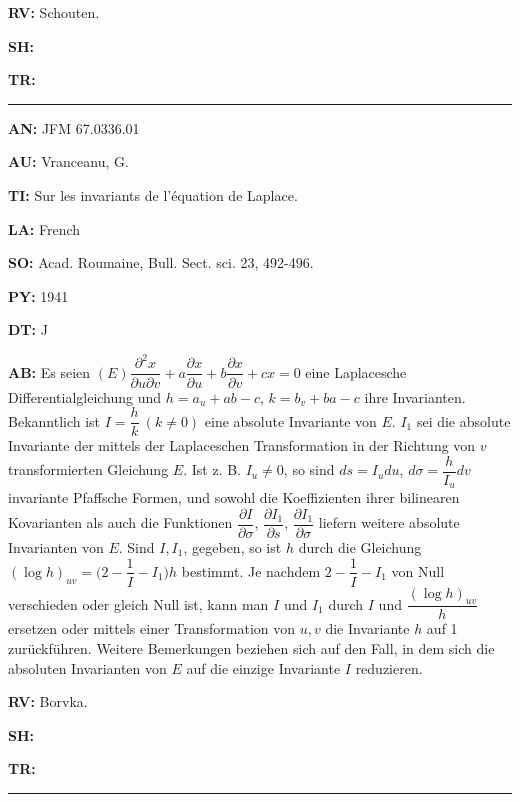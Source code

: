 \item{\bf RV:} Schouten.
\item{\bf SH:}
\item{\bf TR:}

\bigskip\par\noindent\hrule\bigskip\par

\item{\bf AN:} JFM 67.0336.01
\item{\bf AU:} Vranceanu, G.
\item{\bf TI:} Sur les invariants de l'\'equation de Laplace.
\item{\bf LA:} French
\item{\bf SO:} Acad. Roumaine, Bull. Sect. sci. 23, 492-496.
\item{\bf PY:} 1941
\item{\bf DT:} J
\item{\bf AB:}{\parindent15pt
 Es seien $(E)\dfrac{\partial ^2x}{\partial u\partial v}+
a\dfrac{\partial x}{\partial u} + b\dfrac{\partial x}{\partial v}+cx=0$
eine Laplacesche
Differentialgleichung
und $h = a_u + ab - c$, $k = b_v + ba - c$ ihre Invarianten. Bekanntlich ist
$I= \dfrac{h}{k}\ (k\ne 0)$ eine
absolute Invariante von $E$. $I_1$ sei die absolute Invariante der
mittels der Laplaceschen Transformation in der Richtung von $v$ transformierten
Gleichung $E$. Ist z. B. $I_u\ne 0$, so sind $ds = I_udu$,
$d\sigma =\dfrac{h}{I_u}dv$ invariante Pfaffsche
Formen, und sowohl die Koeffizienten ihrer bilinearen Kovarianten als auch die
Funktionen $\dfrac{\partial I}{\partial \sigma}$,
$\dfrac{\partial I_1}{\partial s}$,
$\dfrac{\partial I_1}{\partial \sigma}$
liefern weitere absolute Invarianten von $E$. Sind $I, I_1$,
gegeben, so ist $h$ durch die Gleichung $(\log h)_{uv} = \biggl(2 -\dfrac1I-I_1\biggr)h$
bestimmt. Je
nachdem $2-\dfrac1I-I_1$ von Null verschieden oder gleich Null ist, kann man $I$
und $I_1$
durch $I$ und $\dfrac{(\log h)_{uv}}{h}$ ersetzen oder mittels einer Transformation von
$u, v$ die
Invariante $h$ auf 1 zur\"uckf\"uhren. Weitere Bemerkungen beziehen sich auf den
Fall,
in dem sich die absoluten
Invarianten von $E$ auf die einzige Invariante $I$ reduzieren.
}
\item{\bf RV:} Bor{\uu}vka.
\item{\bf SH:}
\item{\bf TR:}

\bigskip\par\noindent\hrule\bigskip\par

